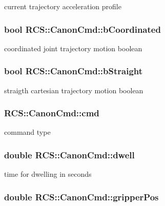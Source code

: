 current trajectory acceleration profile \hypertarget{structRCS_1_1CanonCmd_abae89c19f08f9011d6e5d3f86e8b6df9}{
\subsubsection[{b\-Coordinated}]{\setlength{\rightskip}{0pt plus 5cm}bool R\-C\-S\-::\-Canon\-Cmd\-::b\-Coordinated}}\label{structRCS_1_1CanonCmd_abae89c19f08f9011d6e5d3f86e8b6df9}
coordinated joint trajectory motion boolean \hypertarget{structRCS_1_1CanonCmd_aee8ba85725943aa0102f3305a1bce2a7}{
\subsubsection[{b\-Straight}]{\setlength{\rightskip}{0pt plus 5cm}bool R\-C\-S\-::\-Canon\-Cmd\-::b\-Straight}}\label{structRCS_1_1CanonCmd_aee8ba85725943aa0102f3305a1bce2a7}
straigth cartesian trajectory motion boolean \hypertarget{structRCS_1_1CanonCmd_abf4d78b8604ce73d23d58f1fdcd7305e}{
\subsubsection[{cmd}]{ R\-C\-S\-::\-Canon\-Cmd\-::cmd}}\label{structRCS_1_1CanonCmd_abf4d78b8604ce73d23d58f1fdcd7305e}
command type \hypertarget{structRCS_1_1CanonCmd_a842c88485db006b71c7653e2a2159233}{
\subsubsection[{dwell}]{\setlength{\rightskip}{0pt plus 5cm}double R\-C\-S\-::\-Canon\-Cmd\-::dwell}}\label{structRCS_1_1CanonCmd_a842c88485db006b71c7653e2a2159233}
time for dwelling in seconds \hypertarget{structRCS_1_1CanonCmd_a03e23d97c74abd3c6b5b38aec8ae5fc2}{
\subsubsection[{gripper\-Pos}]{\setlength{\rightskip}{0pt plus 5cm}double R\-C\-S\-::\-Canon\-Cmd\-::gripper\-Pos}}\label{structRCS_1_1CanonCmd_a03e23d97c74abd3c6b5b38aec8ae5fc2}
